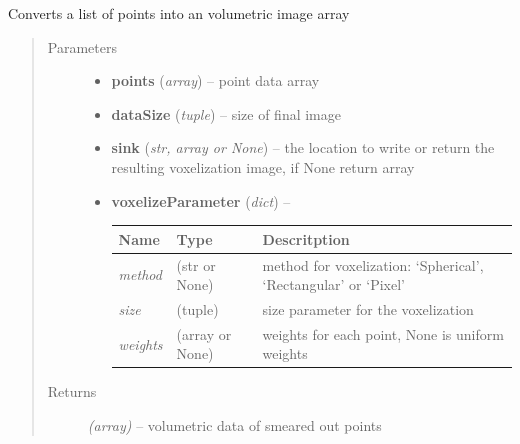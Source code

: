 \documentclass[letterpaper,10pt,english]{sphinxmanual}
\begin{document}
\begin{fulllineitems}
\label{api/ClearMap.Analysis:ClearMap.Analysis.Voxelization.voxelize}
Converts a list of points into an volumetric image array
\begin{quote}\begin{description}
\item[{Parameters}] \leavevmode\begin{itemize}
\item {} 
\textbf{points} (\emph{array}) --
point data array

\item {} 
\textbf{dataSize} (\emph{tuple}) --
size of final image

\item {} 
\textbf{sink} (\emph{str, array or None}) --
the location to write or return the resulting voxelization image, if None return array

\item {} 
\textbf{voxelizeParameter} (\emph{dict}) --

\begin{tabulary}{\linewidth}{|L|L|L|}
\hline
\textsf{\relax 
Name
} & \textsf{\relax 
Type
} & \textsf{\relax 
Descritption
}\\
\hline
\emph{method}
 & 
(str or None)
 & 
method for voxelization: `Spherical', `Rectangular' or `Pixel'
\\
\hline
\emph{size}
 & 
(tuple)
 & 
size parameter for the voxelization
\\
\hline
\emph{weights}
 & 
(array or None)
 & 
weights for each point, None is uniform weights
\\
\hline\end{tabulary}


\end{itemize}

\item[{Returns}] \leavevmode
\emph{(array)} --
volumetric data of smeared out points

\end{description}\end{quote}

\end{fulllineitems}

\end{document}
